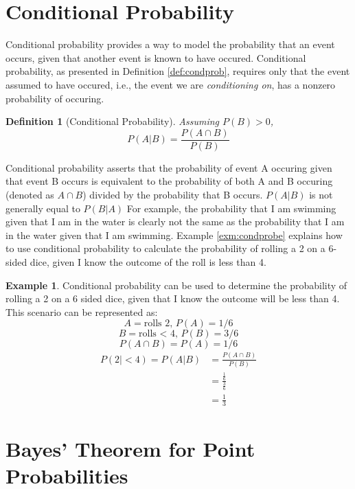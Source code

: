 \documentclass[
  12pt,
]{book}
\theoremstyle{definition}
\newtheorem{definition}{Definition}[chapter]
\theoremstyle{definition}
\newtheorem{example}{Example}[chapter]
\theoremstyle{definition}
\theoremstyle{remark}
\begin{document}
\hypertarget{conditional-probability}{%
\section{Conditional Probability}\label{conditional-probability}}

Conditional probability provides a way to model the probability that an event occurs, given that another event is known to have occured.
Conditional probability, as presented in Definition \ref{def:condprob}, requires only that the event assumed to have occured, i.e., the event we are \emph{conditioning on}, has a nonzero probability of occuring.

\begin{definition}[Conditional Probability]
\protect\hypertarget{def:condprob}{}{\label{def:condprob} {} }\emph{Assuming \(P(B)>0\),}
\[P(A|B)=\frac{P(A \cap B)}{P(B)}\]
\end{definition}

Conditional probability asserts that the probability of event A occuring given that event B occurs is equivalent to the probability of both A and B occuring (denoted as \(A \cap B\)) divided by the probability that B occurs. \(P(A|B)\) is not generally equal to \(P(B|A)\)
For example, the probability that I am swimming given that I am in the water is clearly not the same as the probability that I am in the water given that I am swimming.
Example \ref{exm:condprobe} explains how to use conditional probability to calculate the probability of rolling a 2 on a 6-sided dice, given I know the outcome of the roll is less than 4.

\begin{example}
\protect\hypertarget{exm:condprobe}{}{\label{exm:condprobe} }Conditional probability can be used to determine the probability of rolling a 2 on a 6 sided dice, given that I know the outcome will be less than 4. This scenario can be represented as:
\[A = \textrm{rolls 2, } P(A) = 1/6\]
\[B = \textrm{rolls < 4, } P(B) = 3/6\]
\[P(A \cap B) = P(A) = 1/6\]
\[\begin{split}
P(2|<4) = P(A|B) & = \frac{P(A \cap B)}{P(B)} \\
  & = \frac{\frac{1}{6}}{\frac{3}{6}} \\
  & = \frac{1}{3}
\end{split}\]
\end{example}

\hypertarget{bayes-theorem-for-point-probabilities}{%
\section{Bayes' Theorem for Point Probabilities}\label{bayes-theorem-for-point-probabilities}}
\end{document}
